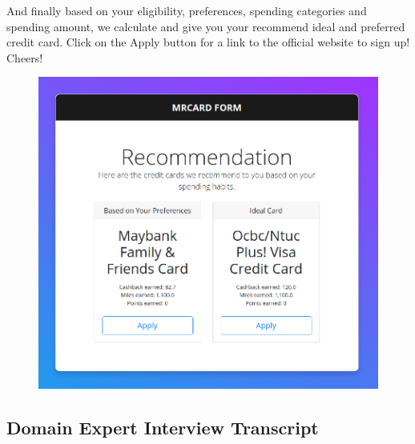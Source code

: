 		And finally based on your eligibility, preferences, spending categories and spending amount, we calculate and give you your recommend ideal and preferred credit card. Click on the Apply button for a link to the official website to sign up! Cheers!

		\begin{figure}[H]
			\centering
			\includegraphics[width=\linewidth]{img/recommendation_v2.png}
		\end{figure}



\subsection{Domain Expert Interview Transcript} %
\label{appendix:appendix_c}

